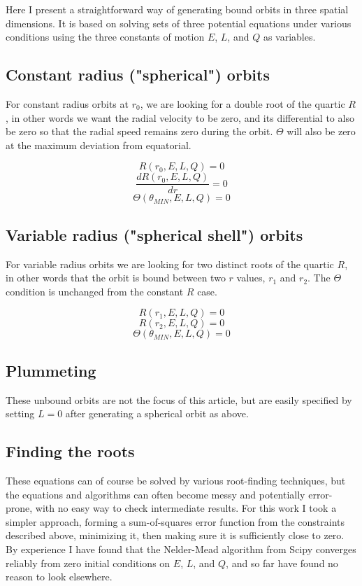 \documentclass[11pt]{article}
\begin{document}
Here I present a straightforward way of generating bound orbits in three spatial dimensions.  It is based on solving sets of three potential equations under various conditions using the three constants of motion $E$, $L$, and $Q$ as variables.

\subsection{Constant radius ("spherical") orbits}

For constant radius orbits at $r_0$, we are looking for a double root of the quartic $R$, in other words we want the radial velocity to be zero, and its differential to also be zero so that the radial speed remains zero during the orbit.  $\Theta$ will also be zero at the maximum deviation from equatorial. 

$$
R(r_0, E, L, Q) = 0
$$
$$
\frac{d R(r_0, E, L, Q)}{d r} = 0
$$
$$
\Theta(\theta_{MIN}, E, L, Q) = 0
$$

\subsection{Variable radius ("spherical shell") orbits}

For variable radius orbits we are looking for two distinct roots of the quartic $R$, in other words that the orbit is bound between two $r$ values, $r_1$ and $r_2$.  The $\Theta$ condition is unchanged from the constant $R$ case.

$$
R(r_1, E, L, Q) = 0
$$
$$
R(r_2, E, L, Q) = 0
$$
$$
\Theta(\theta_{MIN}, E, L, Q) = 0
$$

\subsection{Plummeting}

These unbound orbits are not the focus of this article, but are easily specified by setting $L = 0$ after generating a spherical orbit as above.

\subsection{Finding the roots}

These equations can of course be solved by various root-finding techniques, but the equations and algorithms can often become messy and potentially error-prone, with no easy way to check intermediate results.  For this work I took a simpler approach, forming a sum-of-squares error function from the constraints described above, minimizing it, then making sure it is sufficiently close to zero.  By experience I have found that the Nelder-Mead algorithm from Scipy converges reliably from zero initial conditions on $E$, $L$, and $Q$, and so far have found no reason to look elsewhere.
\end{document}
